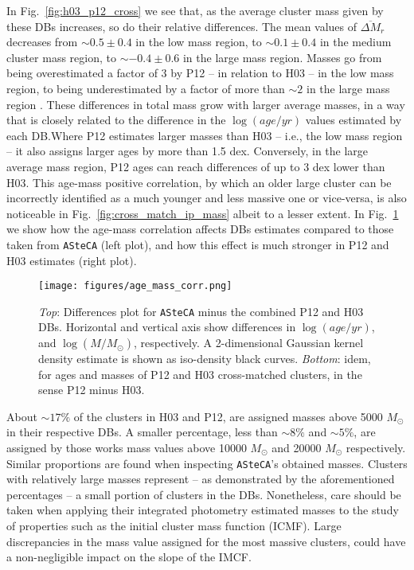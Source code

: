 \documentclass{aa}
\begin{document}
In Fig.~\ref{fig:h03_p12_cross} we see that, as the average cluster mass given by
these DBs increases, so do their relative differences.
The mean values of $\overline{\Delta M}_r$ decreases from ${\sim}0.5\pm0.4$ in
the low mass region, to ${\sim}0.1\pm0.4$ in the medium cluster mass region, to
${\sim-}0.4\pm0.6$ in the large mass region. Masses go from being overestimated
a factor of 3 by P12 -- in relation to H03 -- in the low mass region, to being
underestimated by a factor of more than ${\sim}2$ in the large mass region .
%
These differences in total mass grow with larger average masses, in a way that
is closely related to the difference in the $\log(age/yr)$ values estimated by
each DB.\@ Where P12 estimates larger masses than H03 -- i.e., the low mass
region -- it also assigns larger ages by more than 1.5 dex. Conversely, in the
large average mass region, P12 ages can reach differences of up to 3 dex lower
than H03.
%
This age-mass positive correlation, by which an older large cluster can be
incorrectly identified as a much younger and less massive one or vice-versa, is
also noticeable in Fig.~\ref{fig:cross_match_ip_mass} albeit to a lesser
extent. In Fig.~\ref{fig:age_mass_corr} we show how the age-mass correlation
affects DBs estimates compared to those taken from \texttt{ASteCA} (left plot),
and how this effect is much stronger in P12 and H03 estimates (right plot).

\begin{figure}
\centering
\texttt{[image: figures/age\_mass\_corr.png]}
\caption{\emph{Top}: Differences plot for \texttt{ASteCA} minus the combined P12
and H03 DBs. Horizontal and vertical axis show differences in
$\log(age/yr)$, and $\log(M/M_{\odot})$, respectively.
A 2-dimensional Gaussian kernel density estimate is shown as iso-density black
curves.
\emph{Bottom}: idem, for ages and masses of P12 and H03 cross-matched clusters,
in the sense P12 minus H03.}
\label{fig:age_mass_corr}
\end{figure}

About ${\sim}17\%$ of the clusters in H03 and P12, are assigned masses
above 5000 $M_{\odot}$ in their respective DBs. A smaller percentage,
less than ${\sim}8\%$ and ${\sim}5\%$, are assigned by those works mass values
above 10000 $M_{\odot}$ and 20000 $M_{\odot}$ respectively. Similar proportions
are found when inspecting \texttt{ASteCA}'s obtained masses.
%
Clusters with relatively large masses represent -- as demonstrated by
the aforementioned percentages -- a small portion of clusters in the DBs.
Nonetheless, care should be taken when applying their integrated photometry
estimated masses to the study of properties such as the initial cluster
mass function (ICMF).
Large discrepancies in the mass value assigned for the most massive clusters, could
have a non-negligible impact on the slope of the IMCF.\@
\end{document}
